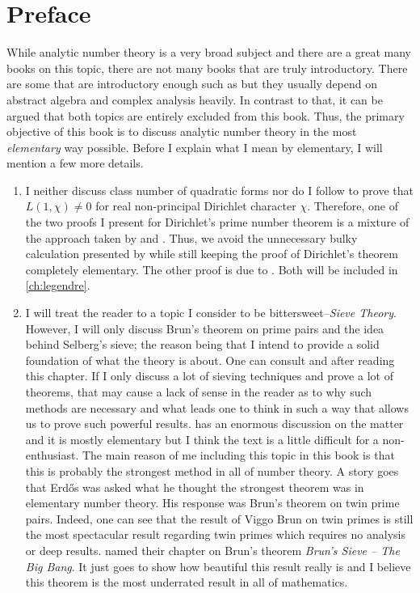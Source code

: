 \documentclass[12pt,leqno]{book}
\theoremstyle{definition}
\begin{document}
	\section*{Preface}
	While analytic number theory is a very broad subject and there are a great many books on this topic, there are not many books that are truly introductory. There are some that are introductory enough such as \textcite{apostol_1976} but they usually depend on abstract algebra and complex analysis heavily. In contrast to that, it can be argued that both topics are entirely excluded from this book. Thus, the primary objective of this book is to discuss analytic number theory in the most \textit{elementary} way possible. Before I explain what I mean by elementary, I will mention a few more details.
		\begin{enumerate}[(1)]
			\item I neither discuss class number of quadratic forms nor do I follow \textcite[Part Two, Chapter III]{landau_1969} to prove that $L(1,\chi)\neq0$ for real non-principal Dirichlet character $\chi$. Therefore, one of the two proofs I present for Dirichlet's prime number theorem is a mixture of the approach taken by \textcite[Part two, Chapter III, $\S$3]{landau_1969} and \textcite[Chapter VI]{apostol_1976}. Thus, we avoid the unnecessary bulky calculation presented by \textcite[Theorem 152]{landau_1969} while still keeping the proof of Dirichlet's theorem completely elementary. The other proof is due to \textcite{selberg_1949}. Both will be included in \autoref{ch:legendre}.
			\item I will treat the reader to a topic I consider to be bittersweet--\textit{Sieve Theory}. However, I will only discuss Brun's theorem on prime pairs and the idea behind Selberg's sieve; the reason being that I intend to provide a solid foundation of what the theory is about. One can consult \textcite{cojocaru_murty_2006} and \textcite{friedlander_iwaniec_2010} after reading this chapter. If I only discuss a lot of sieving techniques and prove a lot of theorems, that may cause a lack of sense in the reader as to why such methods are necessary and what leads one to think in such a way that allows us to prove such powerful results. \textcite{friedlander_iwaniec_2010} has an enormous discussion on the matter and it is mostly elementary but I think the text is a little difficult for a non-enthusiast. The main reason of me including this topic in this book is that this is probably the strongest method in all of number theory. A story goes that Erd\H{o}s was asked what he thought the strongest theorem was in elementary number theory. His response was Brun's theorem on twin prime pairs. Indeed, one can see that the result of Viggo Brun on twin primes is still the most spectacular result regarding twin primes which requires no analysis or deep results. \textcite[Chapter VI]{friedlander_iwaniec_2010} named their chapter on Brun's theorem \textit{Brun’s Sieve – The Big Bang}. It just goes to show how beautiful this result really is and I believe this theorem is the most underrated result in all of mathematics.

\end{enumerate}
\end{document}
